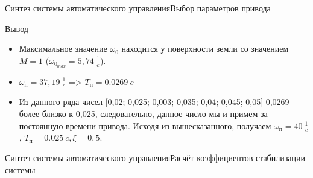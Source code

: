 \begin{frame}{Синтез системы автоматического управления}{Выбор параметров привода}
    \begin{block}{Вывод}
        \begin{itemize}
            \item Максимальное значение $\omega_0$ находится у поверхности земли со значением $M = 1$ ($\omega_{0_{max}} = 5,74 \ \frac{1}{c}$).
            \item $\omega_\text{п} = 37,19 \ \frac{1}{c}$ => $T_{\text{п}} = 0.0269 \ c$ 
            \item Из данного ряда чисел [0,02; 0,025; 0,003; 0,035; 0,04; 0,045; 0,05] 0,0269 более близко к 0,025, следовательно, данное число мы и примем за постоянную времени привода. Исходя из вышесказанного, получаем $\omega_\text{п} = 40 \ \frac{1}{c}$ , $T_{\text{п}} = 0.025 \ c, \xi = 0,5$.
        \end{itemize}
    \end{block}
\end{frame}


\begin{frame}{Синтез системы автоматического управления}{Расчёт коэффициентов стабилизации системы}
    \begin{minipage}[c]{0.45\textwidth}
    \end{minipage}
    \begin{minipage}[c]{0.45\textwidth}
    \end{minipage}
\end{frame}

